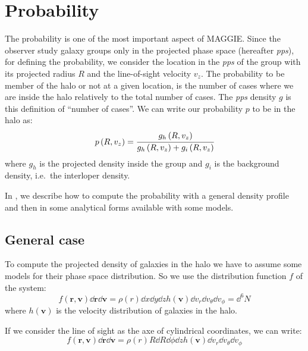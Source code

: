\section{Probability}
\label{sec:probability}

The probability is one of the most important aspect of MAGGIE\@. Since the
observer study galaxy groups only in the projected phase space (hereafter
\emph{pps}), for defining the probability, we consider the location in
the \emph{pps} of the group with its projected radius $R$ and the
line-of-sight velocity $v_z$. The probability to be member of the halo or
not at a given location, is the number of cases where we are inside the halo
relatively to the total number of cases. The \emph{pps} density $g$ is this
definition of ``number of cases''. We can write our probability $p$ to be in
the halo as:
%
\begin{equation}
    \label{eq:probability}
    p \left(R, v_z\right)= \cfrac{g_h \left(R, v_z\right)}
    {g_h \left(R, v_z\right) + g_i \left(R, v_z\right)}
\end{equation}
%
where $g_h$ is the projected density inside the group and $g_i$ is the
background density, i.e.\ the interloper density.

In , we describe how to compute the
probability with a general density profile and then in
 some analytical forms
available with some models.

\subsection{General case}
\label{sub:general_case}

To compute the projected density of galaxies in the halo we have to assume some
models for their phase space distribution. So we use the distribution function
$f$ of the system:
%
\begin{equation}
    f\left(\textbf{r},\textbf{v}\right)\dd\textbf{r}\dd\textbf{v}
    =\rho\left(r\right)\dd{x}\dd{y}\dd{z}
    h\left(\textbf{v}\right)
    \dd v_r\dd v_\theta\dd v_\phi=
    \dd^6 N
\end{equation}
%
where $h\left(\textbf{v}\right)$ is the velocity distribution of galaxies in
the halo.

If we consider the line of sight as the axe of cylindrical coordinates, we
can write:
%
\begin{equation}
    f\left(\textbf{r},\textbf{v}\right)\dd\textbf{r}\dd\textbf{v}=
    \rho\left(r\right)R\dd{R}\dd\phi\dd{z}h\left(\textbf{v}\right)
    \dd{v_r}\dd{v_\theta}\dd{v_\phi}
\end{equation}

